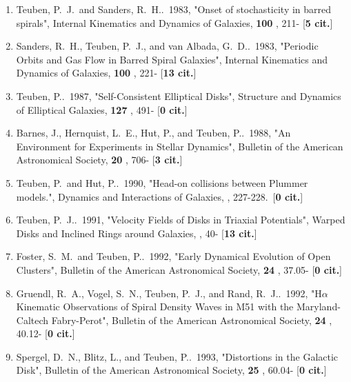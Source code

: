 \documentclass[11pt,letterpaper]{article}
\begin{document}
\begin{enumerate}[resume,label=\textbf{\arabic*}.]


\item  
Teuben, P.~J.~and Sanders, R.~H..\  1983,  "Onset of stochasticity in 
barred spirals", Internal Kinematics and Dynamics of Galaxies,  {\bf 100} , 
211- [{\bf 5 cit.}] 

\item  
Sanders, R.~H., Teuben, P.~J., and van Albada, G.~D..\  1983,  "Periodic 
Orbits and Gas Flow in Barred Spiral Galaxies", Internal Kinematics and 
Dynamics of Galaxies,  {\bf 100} , 221- [{\bf 13 cit.}] 

\item  
Teuben, P..\  1987,  "Self-Consistent Elliptical Disks", Structure and 
Dynamics of Elliptical Galaxies,  {\bf 127} , 491- [{\bf 0 cit.}] 

\item  
Barnes, J., Hernquist, L.~E., Hut, P., and Teuben, P..\  1988,  "An 
Environment for Experiments in Stellar Dynamics", Bulletin of the American 
Astronomical Society,  {\bf 20} , 706- [{\bf 3 cit.}] 

\item  
Teuben, P.~and Hut, P..\  1990,  "Head-on collisions between Plummer 
models.", Dynamics and Interactions of Galaxies,  , 227-228.\  [{\bf 0 
cit.}] 

\item  
Teuben, P.~J..\  1991,  "Velocity Fields of Disks in Triaxial Potentials", 
Warped Disks and Inclined Rings around Galaxies,  , 40- [{\bf 13 cit.}] 

\item  
Foster, S.~M.~and Teuben, P..\  1992,  "Early Dynamical Evolution of Open 
Clusters", Bulletin of the American Astronomical Society,  {\bf 24} , 
37.05- [{\bf 0 cit.}] 

\item  
Gruendl, R.~A., Vogel, S.~N., Teuben, P.~J., and Rand, R.~J..\  1992,  
"H{$\alpha$} Kinematic Observations of Spiral Density Waves in M51 with the 
Maryland-Caltech Fabry-Perot", Bulletin of the American Astronomical 
Society,  {\bf 24} , 40.12- [{\bf 0 cit.}] 

\item  
Spergel, D.~N., Blitz, L., and Teuben, P..\  1993,  "Distortions in the 
Galactic Disk", Bulletin of the American Astronomical Society,  {\bf 25} , 
60.04- [{\bf 0 cit.}] 


\end{enumerate}
\end{document}
